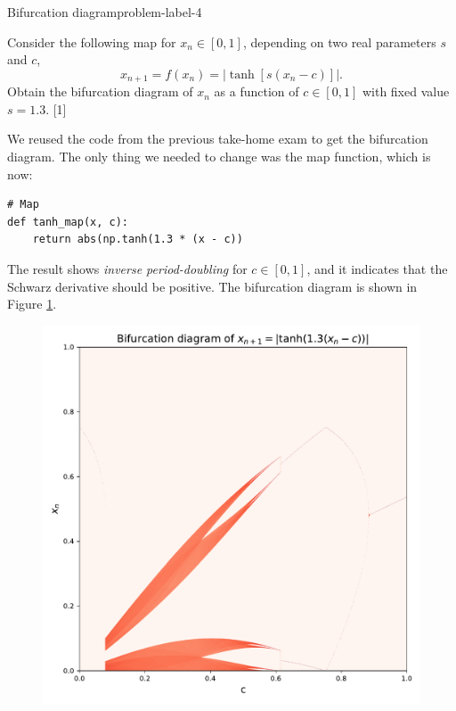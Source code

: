\begin{problem}{Bifurcation diagram}{problem-label-4}

Consider the following map for $x_n \in [0,1]$, depending on two real parameters $s$ and $c$,
\[
    x_{n+1} = f(x_n) = |\tanh[s(x_n-c)]|.
\]
Obtain the bifurcation diagram of $x_n$ as a function of $c \in [0,1]$ with fixed value $s=1.3$. [1]

\end{problem}

We reused the code from the previous take-home exam to get the bifurcation diagram. The only
thing we needed to change was the map function, which is now:

\begin{lstlisting}[style=pythonstyle]
# Map 
def tanh_map(x, c):
    return abs(np.tanh(1.3 * (x - c))
\end{lstlisting}

The result shows \textit{inverse period-doubling} for $c \in [0, 1]$, and it indicates
that the Schwarz derivative should be positive. 
The bifurcation diagram is shown in Figure \ref{fig:1a}.
\begin{figure}[!ht]
    \centering
    \includegraphics[scale=0.65]{images/tanh.pdf}
    \label{fig:1a}
\end{figure}

